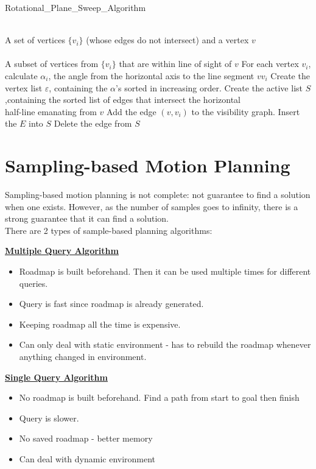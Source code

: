\documentclass[11pt]{article}
\begin{document}
\begin{algorithm} 
	\caption{Rotational\_Plane\_Sweep\_Algorithm} 
	\label{alg:RPS_alg} 
	\begin{algorithmic}[1]
		\REQUIRE~~\\
		A set of vertices $\{v_i\} $ (whose edges do not intersect) and a vertex $v$ \\
		\ENSURE~~\\
		A subset of vertices from $\{v_i\} $ that are within line of sight of $v$
		\STATE For each vertex $v_i$, calculate $\alpha_i$,  the angle from the horizontal axis to the line segment $vv_i$
		\STATE Create the vertex list $\varepsilon$, containing the $\alpha$'s sorted in increasing order.
		\STATE  Create the active list $S$,containing the sorted list of edges that intersect the horizontal\\
		half-line emanating from $v$
		\STATE Add the edge $(v,v_i)$ to the visibility graph.
		\ENDIF 
		\STATE Insert the $E$ into $S$
		\ENDIF
		\STATE Delete the edge from $S$
		\ENDIF
		\ENDFOR
	\end{algorithmic}
\end{algorithm}

\newpage
\section{Sampling-based Motion Planning}
Sampling-based motion planning is not complete: not guarantee to find a solution when one exists. However, as the number of samples goes to infinity, there is a strong guarantee that it can find a solution.\\
There are 2 types of sample-based planning algorithms:\\
\begin{multicols*}{2}
\textbf{\underline{Multiple Query Algorithm}}
\begin{itemize}
\item Roadmap is built beforehand. Then it can be used multiple times for different queries.
\item Query is fast since roadmap is already generated.
\item Keeping roadmap all the time is expensive.
\item Can only deal with static environment - has to rebuild the roadmap whenever anything changed in environment.
\end{itemize}
\vfill\null
\columnbreak
\textbf{\underline{Single Query Algorithm}}
\begin{itemize}
\item No roadmap is built beforehand. Find a path from start to goal then finish
\item Query is slower.\\
\item No saved roadmap - better memory \\
\item Can deal with dynamic environment 
\end{itemize}
\end{multicols*}
\end{document}
